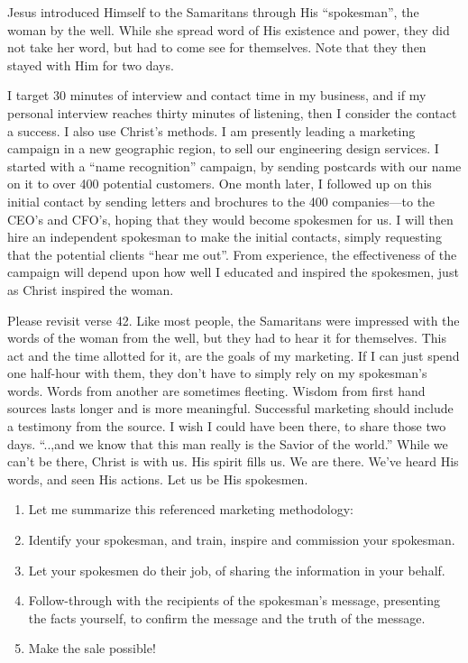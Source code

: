 \documentclass[12pt]{memoir}
\begin{document}
Jesus introduced Himself to the Samaritans through His ``spokesman'',
the woman by the well. While she spread word of His existence and
power, they did not take her word, but had to come see for themselves.
Note that they then stayed with Him for two days. 

I target 30 minutes of interview and contact time in my business,
and if my personal interview reaches thirty minutes of listening,
then I consider the contact a success. I also use Christ's methods.
I am presently leading a marketing campaign in a new geographic region,
to sell our engineering design services. I started with a ``name
recognition'' campaign, by sending postcards with our name on it
to over 400 potential customers. One month later, I followed up on
this initial contact by sending letters and brochures to the 400 companies---to
the CEO's and CFO's, hoping that they would become spokesmen for us.
I will then hire an independent spokesman to make the initial contacts,
simply requesting that the potential clients ``hear me out''. From
experience, the effectiveness of the campaign will depend upon how
well I educated and inspired the spokesmen, just as Christ inspired
the woman.

Please revisit verse 42. Like most people, the Samaritans were impressed
with the words of the woman from the well, but they had to hear it
for themselves. This act and the time allotted for it, are the goals
of my marketing. If I can just spend one half-hour with them, they
don't have to simply rely on my spokesman's words. Words from another
are sometimes fleeting. Wisdom from first hand sources lasts longer
and is more meaningful. Successful marketing should include a testimony
from the source. I wish I could have been there, to share those two
days. ``..,and we know that this man really is the Savior of the
world.'' While we can't be there, Christ is with us. His spirit fills
us. We are there. We've heard His words, and seen His actions. Let
us be His spokesmen.
\begin{enumerate}
\item Let me summarize this referenced marketing methodology:
\item Identify your spokesman, and train, inspire and commission your spokesman. 
\item Let your spokesmen do their job, of sharing the information in your
behalf. 
\item Follow-through with the recipients of the spokesman's message, presenting
the facts yourself, to confirm the message and the truth of the message. 
\item Make the sale possible! 
\end{enumerate}
\end{document}
